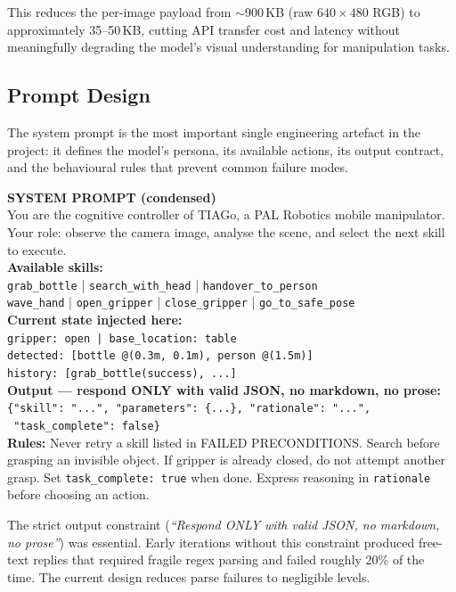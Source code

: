 This reduces the per-image payload from $\sim$900\,KB (raw $640\times480$ RGB)
to approximately 35--50\,KB, cutting API transfer cost and latency without
meaningfully degrading the model's visual understanding for manipulation
tasks.

\subsection{Prompt Design}

The system prompt is the most important single engineering artefact in the
project: it defines the model's persona, its available actions, its output
contract, and the behavioural rules that prevent common failure modes.

\begin{mdframed}[style=promptbox]
\small
\textbf{SYSTEM PROMPT (condensed)}\\[4pt]
You are the cognitive controller of TIAGo, a PAL Robotics mobile manipulator.
Your role: observe the camera image, analyse the scene, and select the next
skill to execute.\\[4pt]
\textbf{Available skills:}\\
\texttt{grab\_bottle} | \texttt{search\_with\_head} |
\texttt{handover\_to\_person}\\
\texttt{wave\_hand} | \texttt{open\_gripper} | \texttt{close\_gripper} |
\texttt{go\_to\_safe\_pose}\\[4pt]
\textbf{Current state injected here:}\\
\texttt{gripper: open | base\_location: table}\\
\texttt{detected: [bottle @(0.3m, 0.1m), person @(1.5m)]}\\
\texttt{history: [grab\_bottle(success), ...]}\\[4pt]
\textbf{Output --- respond ONLY with valid JSON, no markdown, no prose:}\\
\texttt{\{"skill": "...", "parameters": \{...\}, "rationale": "...",}\\
\texttt{~"task\_complete": false\}}\\[4pt]
\textbf{Rules:} Never retry a skill listed in FAILED PRECONDITIONS.
Search before grasping an invisible object. If gripper is already closed,
do not attempt another grasp. Set \texttt{task\_complete: true} when done.
Express reasoning in \texttt{rationale} before choosing an action.
\end{mdframed}

The strict output constraint (\emph{``Respond ONLY with valid JSON, no
markdown, no prose''}) was essential.
Early iterations without this constraint produced free-text replies that
required fragile regex parsing and failed roughly 20\% of the time.
The current design reduces parse failures to negligible levels.

